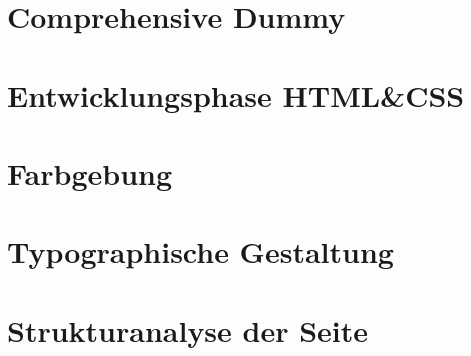 \section{Comprehensive Dummy}

\section{Entwicklungsphase HTML&CSS}

\section{Farbgebung}

\section{Typographische Gestaltung}

\section{Strukturanalyse der Seite}